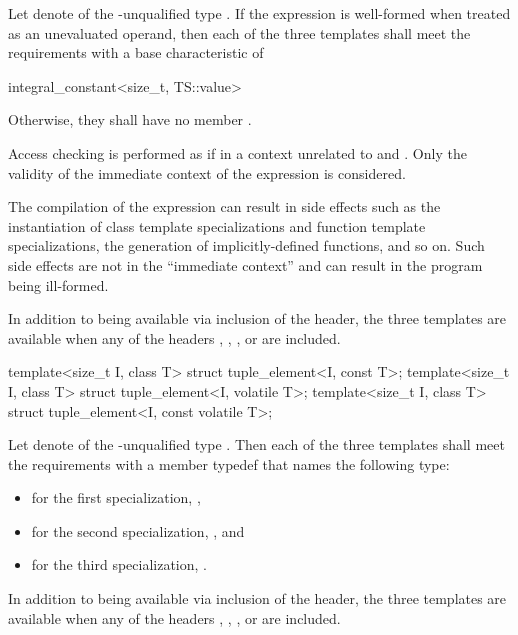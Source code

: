 \begin{itemdescr}
\pnum
Let  denote  of the \cv-unqualified type .
If the expression  is well-formed
when treated as an unevaluated operand, then each
of the three templates shall meet the  requirements
with a base characteristic of
\begin{codeblock}
integral_constant<size_t, TS::value>
\end{codeblock}
Otherwise, they shall have no member .

\pnum
Access checking is performed as if in a context
unrelated to  and .
Only the validity of the immediate context of the expression is considered.
\begin{note}
The compilation of the expression can result in side effects
such as the instantiation of class template specializations and
function template specializations, the generation of implicitly-defined functions, and so on.
Such side effects are not in the ``immediate context'' and
can result in the program being ill-formed.
\end{note}

\pnum
In addition to being available via inclusion of the  header,
the three templates are available
when any of the headers
,
,
, or
are included.
\end{itemdescr}

%
\begin{itemdecl}
template<size_t I, class T> struct tuple_element<I, const T>;
template<size_t I, class T> struct tuple_element<I, volatile T>;
template<size_t I, class T> struct tuple_element<I, const volatile T>;
\end{itemdecl}

\begin{itemdescr}
\pnum
Let  denote  of the \cv-unqualified type . Then
each of the three templates shall meet the 
requirements with a member typedef  that names the following
type:
\begin{itemize}
\item
for the first specialization, ,
\item
for the second specialization, , and
\item
for the third specialization, .
\end{itemize}

\pnum
In addition to being available via inclusion of the  header,
the three templates are available
when any of the headers
,
,
, or
are included.
\end{itemdescr}

